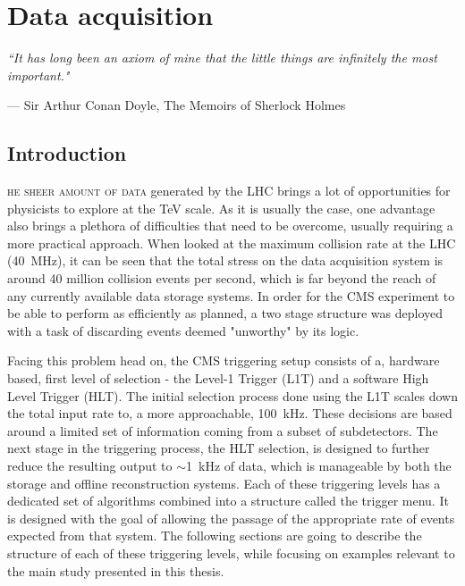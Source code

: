 \chapter{Data acquisition}
\label{ch:daq}
\setlength{}
\setlength\epigraphrule{0pt}
\epigraph{\itshape``It has long been an axiom of mine that the little things are infinitely the most important."}{--- \textup{Sir Arthur Conan Doyle, The Memoirs of Sherlock Holmes}}
\section{Introduction}
\hspace{10pt}\lettrine[lines=2]{}{he sheer amount of data} generated by the LHC brings a lot of opportunities for physicists to explore at the TeV scale. As it is usually the case, one advantage also brings a plethora of difficulties that need to be overcome, usually requiring a more practical approach. When looked at the maximum collision rate at the LHC (40~MHz), it can be seen that the total stress on the data acquisition system is around 40 million collision events per second, which is far beyond the reach of any currently available data storage systems. In order for the CMS experiment to be able to perform as efficiently as planned, a two stage structure was deployed with a task of discarding events deemed "unworthy" by its logic.

\hspace{10pt} Facing this problem head on, the CMS triggering setup consists of a, hardware based, first level of selection - the Level-1 Trigger (L1T) and a software High Level Trigger (HLT). The initial selection process done using the L1T scales down the total input rate to, a more approachable, 100~kHz. These decisions are based around a limited set of information coming from a subset of subdetectors. The next stage in the triggering process, the HLT selection, is designed to further reduce the resulting output to $\sim$1~kHz of data, which is manageable by both the storage and offline reconstruction systems. Each of these triggering levels has a dedicated set of algorithms combined into a structure called the trigger menu. It is designed with the goal of allowing the passage of the appropriate rate of events expected from that system. The following sections are going to describe the structure of each of these triggering levels, while focusing on examples relevant to the main study presented in this thesis.

